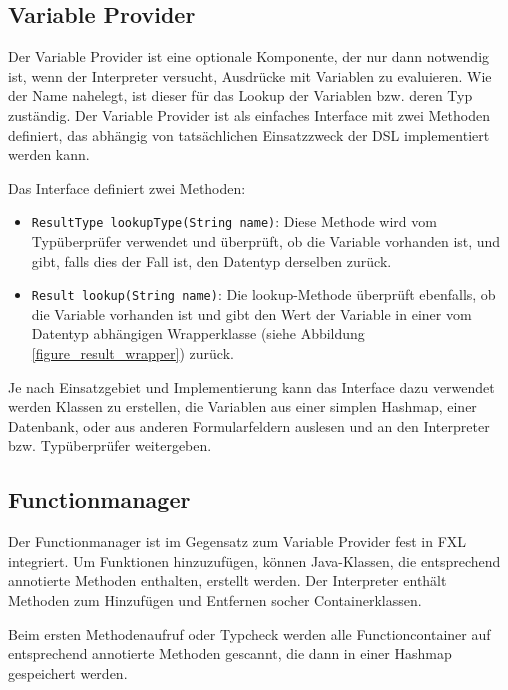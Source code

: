 \subsection{Variable Provider}

Der Variable Provider ist eine optionale Komponente, der nur dann not\-wen\-dig ist, wenn der Interpreter versucht, Ausdrücke mit Variablen zu evaluieren. Wie der Name nahelegt, ist dieser für das Lookup der Variablen bzw. deren Typ zuständig. Der Variable Provider ist als einfaches Interface mit zwei Methoden definiert, das abhängig von tatsächlichen Einsatzzweck der DSL implementiert werden kann.

Das Interface definiert zwei Methoden:

\begin{itemize}

	\item \texttt{ResultType lookupType(String name)}: Diese Methode wird vom Typ\-über\-prü\-fer verwendet und überprüft, ob die Variable vorhanden ist, und gibt, falls dies der Fall ist, den Datentyp derselben zurück.
	
	\item \texttt{Result lookup(String name)}: Die lookup-Methode überprüft ebenfalls, ob die Variable vorhanden ist und gibt den Wert der Variable in einer vom Datentyp abhängigen Wrapperklasse (siehe Abbildung \ref{figure_result_wrapper}) zurück.
		
\end{itemize}

Je nach Einsatzgebiet und Implementierung kann das Interface dazu verwendet werden Klassen zu erstellen, die Variablen aus einer simplen Hashmap, einer Datenbank, oder aus anderen Formularfeldern auslesen und an den Interpreter bzw. Typüberprüfer weitergeben.

\subsection{Functionmanager}

Der Functionmanager ist im Gegensatz zum Variable Provider fest in FXL integriert. Um Funktionen hinzuzufügen, können Java-Klassen, die ent\-sprech\-end annotierte Methoden enthalten, erstellt werden. Der Interpreter enthält Methoden zum Hinzufügen und Entfernen socher Containerklassen. 

Beim ersten Methodenaufruf oder Typcheck werden alle Functioncontainer auf ent\-sprech\-end annotierte Methoden gescannt, die dann in einer Hashmap gespeichert werden.

